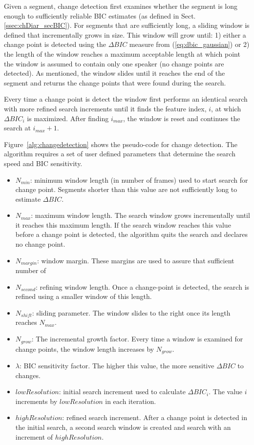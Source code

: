 Given a segment, change detection first examines whether the segment is long enough to sufficiently reliable BIC estimates (as defined in Sect.\ref{ssec:chDiar_secBIC}). 
For segments that are sufficiently long, a sliding window is defined that incrementally grows in size. 
This window will grow until: 1) either a change point is detected using the $\Delta BIC$ measure from (\ref{eq:dbic_gaussian}) or 2) the length of the window reaches a maximum acceptable length at which point the window is assumed to contain only one speaker (no change points are detected). 
As mentioned, the window slides until it reaches the end of the segment and returns the change points that were found during the search. 

Every time a change point is detect the window first performs an identical search with more refined search increments until it finds the feature index, $i$, at which $\Delta BIC_i$ is maximized. 
After finding $i_{max}$, the window is reset and continues the search at $i_{max}+1$. 

Figure~\ref{alg:changedetection} shows the pseudo-code for change detection. 
The algorithm requires a set of user defined parameters that determine the search speed and BIC sensitivity. 
\begin{itemize}
	\item $N_{min}$: minimum window length (in number of frames) used to start search for change point. Segments shorter than this value are not sufficiently long to estimate $\Delta BIC$. 
	\item $N_{max}$: maximum window length. The search window grows incrementally until it reaches this maximum length. If the search window reaches this value before a change point is detected, the algorithm quits the search and declares no change point. 
	\item $N_{margin}$: window margin. These margins are used to assure that sufficient number of 
	\item $N_{second}$: refining window length. Once a change-point is detected, the search is refined using a smaller window of this length. 
	\item $N_{shift}$: sliding parameter. The window slides to the right once its length reaches $N_{max}$. 
	\item $N_{grow}$: The incremental growth factor. Every time a window is examined for change points, the window length increases by $N_{grow}$.
	\item $\lambda$: BIC sensitivity factor. The higher this value, the more sensitive $\Delta BIC$ to changes. 
	\item $lowResolution$: initial search increment used to calculate $\Delta BIC_i$. The value $i$ increments by $lowResolution$ in each iteration.
	\item $highResolution$: refined search increment. After a change point is detected in the initial search, a second search window is created and search with an increment of $highResolution$. 
\end{itemize}

